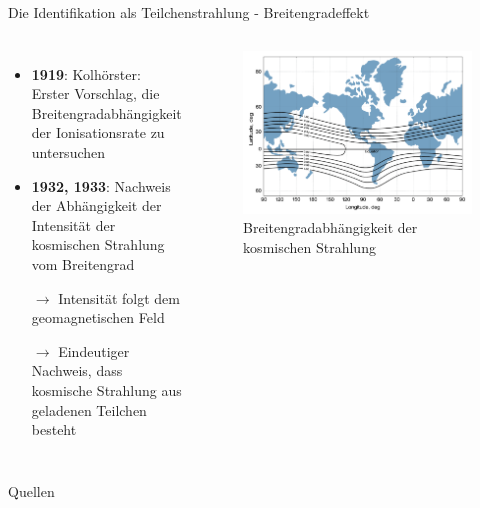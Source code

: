 \documentclass[aspectratio=1610, professionalfonts, 9pt, hyperref={colorlinks=false}]{beamer}
\begin{document}
\begin{frame}{Die Identifikation als Teilchenstrahlung - Breitengradeffekt}
  \begin{columns}
      \begin{itemize}
        \setlength\itemsep{0.5em}
        \item \textbf{1919}: Kolhörster: Erster Vorschlag, die Breitengradabhängigkeit der Ionisationsrate zu untersuchen
        \item \textbf{1932, 1933}: Nachweis der Abhängigkeit der Intensität der kosmischen Strahlung vom Breitengrad
        \item [$\rightarrow$] Intensität folgt dem geomagnetischen Feld
        \item [$\rightarrow$] Eindeutiger Nachweis, dass kosmische Strahlung aus geladenen Teilchen besteht
      \end{itemize}
        \vspace*{10px}
  
      \begin{figure}
          \centering
          \includegraphics[width=\linewidth]{images/scrrenshot}
          \caption{Breitengradabhängigkeit der kosmischen Strahlung \cite{9789400754225}}
      \end{figure}
  \end{columns}
\end{frame}

\begin{frame}[allowframebreaks]{Quellen}
	\printbibliography

\end{frame}
\end{document}
